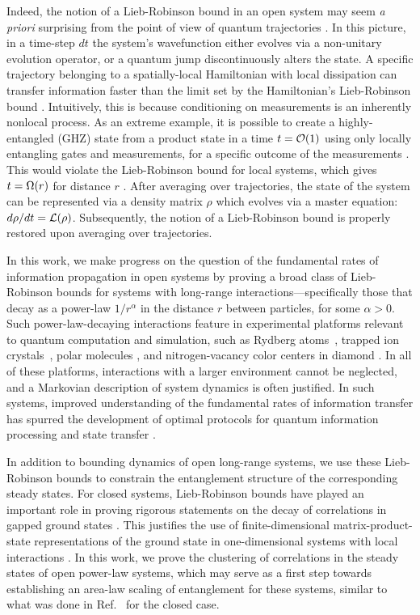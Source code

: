 Indeed, the notion of a  Lieb-Robinson bound in an open system may seem \textit{a priori}  surprising from the point of view of quantum trajectories \cite{Knight1998}. In this picture,  in a time-step $dt$ the system's wavefunction either evolves via a non-unitary evolution operator, or a quantum jump discontinuously  alters the state.
A specific  trajectory belonging to a spatially-local Hamiltonian with local dissipation can transfer information faster than  the limit set by the Hamiltonian's Lieb-Robinson bound \cite{Ashida2018}. Intuitively, this is because conditioning on measurements is an inherently nonlocal process.  As an extreme example, it is possible to create a highly-entangled (GHZ) state from a product state in a time $t = \O{1}$ using only locally entangling gates  and measurements, for a specific outcome of the measurements \cite{Pham2013}.  This would violate the Lieb-Robinson bound for local systems, which gives $t = \W{r}$ for distance $r$ \cite{bigO}. After averaging over trajectories, the state of the system can be represented via a density matrix $\rho$ which evolves via a master equation: $ d \rho / dt =  \mathcal{L} (\rho) $. Subsequently, the notion of a Lieb-Robinson bound is properly restored upon averaging over trajectories.

In this work, we make progress on the question of the fundamental rates of information propagation in open systems by proving a broad class of Lieb-Robinson bounds for systems with long-range interactions---specifically those that decay as a power-law $1/r^\alpha$ in the distance  $r$ between particles, for some $\alpha > 0$.
Such power-law-decaying interactions feature in experimental platforms relevant to quantum computation and simulation, such as Rydberg atoms~\cite{Saffman2010}, trapped ion crystals~\cite{Britton2012,Monroe2021}, polar molecules \cite{Yan2013}, and nitrogen-vacancy color centers in diamond \cite{Yao2012}.
In all of these platforms, interactions with a larger environment cannot be neglected, and a Markovian description of system dynamics is often justified.  In such systems, improved understanding of the fundamental rates of information transfer has spurred the development of optimal protocols for quantum information processing and state transfer \cite{Eldredge2017,Tran2021}.

In addition to bounding dynamics of open long-range systems, we use these Lieb-Robinson bounds to constrain the entanglement structure of the corresponding steady states.
For closed systems, Lieb-Robinson bounds have played an important role in proving rigorous statements on the decay of correlations in gapped ground states \cite{Hastings2006}. This justifies the use of finite-dimensional matrix-product-state representations of the ground state in one-dimensional systems with local interactions \cite{Hastings2007}.
In this work, we prove the clustering of correlations in the steady states of open power-law systems, which may serve as a first step towards establishing an area-law scaling of entanglement for these systems, similar to what was done in Ref.~\cite{Gong2017} for the closed case.

